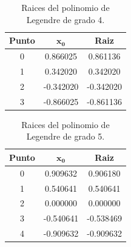 \begin{minipage}{7.5cm}
    \vspace{0.65cm}
    \begin{table}[H]
        \centering
        \begin{tabular}{ccc} \hline
            \textbf{Punto} & $\mathbf{x_0}$ & \textbf{Raiz} \\ \hline
            0              & 0.866025       & 0.861136      \\
            1              & 0.342020       & 0.342020      \\
            2              & -0.342020      & -0.342020     \\
            3              & -0.866025      & -0.861136     \\ \hline
        \end{tabular}
        \caption{Raices del polinomio de Legendre de grado 4.}
        \label{table:problema2_4}
    \end{table}
\end{minipage}
\hspace{1cm}
\begin{minipage}{7.5cm}
    \begin{table}[H]
        \centering
        \begin{tabular}{ccc} \hline
            \textbf{Punto} & $\mathbf{x_0}$ & \textbf{Raiz} \\ \hline
            0              & 0.909632       & 0.906180      \\
            1              & 0.540641       & 0.540641      \\
            2              & 0.000000       & 0.000000      \\
            3              & -0.540641      & -0.538469     \\
            4              & -0.909632      & -0.909632     \\  \hline
        \end{tabular}
        \caption{Raices del polinomio de Legendre de grado 5.}
        \label{table:problema2_5}
    \end{table}
\end{minipage}

